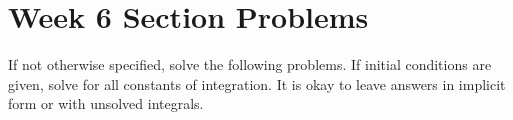 \documentclass[letterpaper, fontsize=11pt]{scrartcl} %
\numberwithin{equation}{section} %
\numberwithin{figure}{section} %
\numberwithin{table}{section} %
\begin{document}

\newcommand{\horrule}[1]{\rule{\linewidth}{#1}} %


\section*{Week 6 Section Problems}
\par If not otherwise specified, solve the following problems. If initial conditions are given, solve for all constants of integration. It is okay to leave answers in implicit form or with unsolved integrals. 
\end{document}

